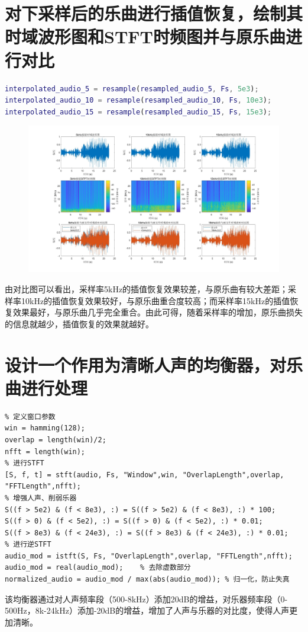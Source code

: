 \documentclass[UTF8,a4paper,11pt]{ctexart}
\begin{document}
\section{对下采样后的乐曲进行插值恢复，绘制其时域波形图和STFT时频图并与原乐曲进行对比}

\begin{lstlisting}[language=matlab]
interpolated_audio_5 = resample(resampled_audio_5, Fs, 5e3);
interpolated_audio_10 = resample(resampled_audio_10, Fs, 10e3);
interpolated_audio_15 = resample(resampled_audio_15, Fs, 15e3);
\end{lstlisting}

\begin{figure}[H]   %
    \includegraphics[width=\linewidth]{PA4_3.jpg}
\end{figure}

由对比图可以看出，采样率5kHz的插值恢复效果较差，与原乐曲有较大差距；采样率10kHz的插值恢复效果较好，与原乐曲重合度较高；而采样率15kHz的插值恢复效果最好，与原乐曲几乎完全重合。由此可得，随着采样率的增加，原乐曲损失的信息就越少，插值恢复的效果就越好。

\section{设计一个作用为清晰人声的均衡器，对乐曲进行处理}
\begin{lstlisting}
% 定义窗口参数
win = hamming(128);
overlap = length(win)/2;
nfft = length(win);
% 进行STFT
[S, f, t] = stft(audio, Fs, "Window",win, "OverlapLength",overlap, "FFTLength",nfft);
% 增强人声、削弱乐器
S((f > 5e2) & (f < 8e3), :) = S((f > 5e2) & (f < 8e3), :) * 100;
S((f > 0) & (f < 5e2), :) = S((f > 0) & (f < 5e2), :) * 0.01;
S((f > 8e3) & (f < 24e3), :) = S((f > 8e3) & (f < 24e3), :) * 0.01;
% 进行逆STFT
audio_mod = istft(S, Fs, "OverlapLength",overlap, "FFTLength",nfft);
audio_mod = real(audio_mod);    % 去除虚数部分
normalized_audio = audio_mod / max(abs(audio_mod)); % 归一化，防止失真
\end{lstlisting}

该均衡器通过对人声频率段（500-8kHz）添加20dB的增益，对乐器频率段（0-500Hz，8k-24kHz）添加-20dB的增益，增加了人声与乐器的对比度，使得人声更加清晰。
\end{document}

